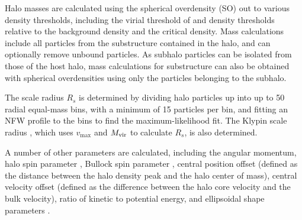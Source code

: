 Halo masses are calculated using the spherical overdensity (SO) out to various density thresholds, including the virial threshold of \citet{1998ApJ...495...80B} and density thresholds relative to the background density and the critical density.  Mass calculations include all particles from the substructure contained in the halo, and can optionally remove unbound particles.  As subhalo particles can be isolated from those of the host halo, mass calculations for substructure can also be obtained with spherical overdensities using only the particles belonging to the subhalo.

The scale radius $R_{s}$ is determined by dividing halo particles up into up to 50 radial equal-mass bins, with a minimum of 15 particles per bin, and fitting an NFW profile to the bins to find the maximum-likelihood fit.  The Klypin scale radius \citep{2011ApJ...740..102K}, which uses $v_{\max}$ and ${M_{\mathrm{vir}}}$ to calculate $R_{s}$, is also determined.

A number of other parameters are calculated, including the angular momentum, halo spin parameter \citep{1969ApJ...155..393P}, Bullock spin parameter \citep{2001ApJ...555..240B}, central position offset (defined as the distance between the halo density peak and the halo center of mass), central velocity offset (defined as the difference between the halo core velocity and the bulk velocity), ratio of kinetic to potential energy, and ellipsoidal shape parameters \citep{2011ApJS..197...30Z}.





